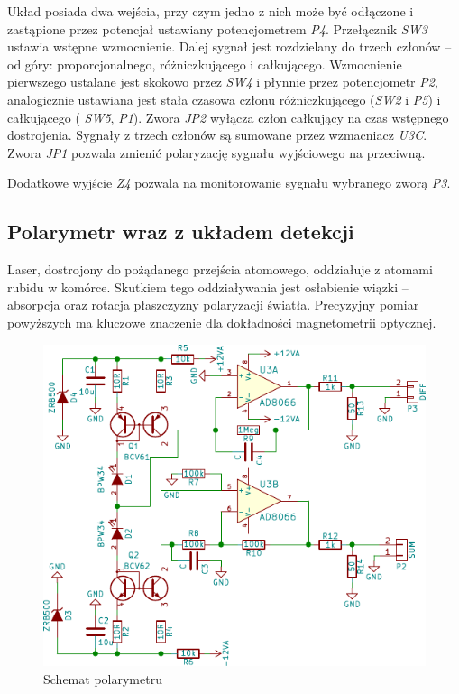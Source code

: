 \documentclass[a4paper,10pt]{article}
\begin{document}
Układ posiada dwa wejścia, przy czym jedno z nich może być odłączone i zastąpione przez potencjał ustawiany potencjometrem \textit{P4}. Przełącznik \textit{SW3} ustawia wstępne wzmocnienie.
Dalej sygnał jest rozdzielany do trzech członów -- od góry: proporcjonalnego, różniczkującego i całkującego.
Wzmocnienie pierwszego ustalane jest skokowo przez \textit{SW4} i płynnie przez potencjometr \textit{P2}, analogicznie ustawiana jest stała czasowa członu różniczkującego (\textit{SW2} i \textit{P5}) i całkującego ( \textit{SW5}, \textit{P1}). Zwora \textit{JP2} wyłącza człon całkujący na czas wstępnego dostrojenia.
Sygnały z trzech członów są sumowane przez wzmacniacz \textit{U3C}. Zwora \textit{JP1} pozwala zmienić polaryzację sygnału wyjściowego na przeciwną.

Dodatkowe wyjście \textit{Z4} pozwala na monitorowanie sygnału wybranego zworą \textit{P3}.

\subsection{Polarymetr wraz z układem detekcji}

Laser, dostrojony do pożądanego przejścia atomowego, oddziałuje z atomami rubidu w komórce.
Skutkiem tego oddziaływania jest osłabienie wiązki -- absorpcja oraz rotacja płaszczyzny polaryzacji światła.
Precyzyjny pomiar powyższych ma kluczowe znaczenie dla dokładności magnetometrii optycznej.

\begin{figure}
\begin{center}
 \includegraphics{./obrazki/polarymetr.pdf}
\end{center}
\caption{Schemat polarymetru}
\label{sch-mod}
\end{figure}
\end{document}
